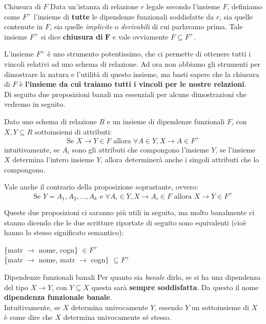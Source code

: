 \documentclass[12pt]{report}
\newcommand{\ra}{
	\rightarrow
}
\begin{document}
	\begin{definizione}{Chiusura di $F$}{}
		Data un'istanza di relazione $r$ legale secondo l'insieme $F$, definiamo come $F^+$ l'insieme di \textbf{tutte} le dipendenze funzionali soddisfatte da $r$, sia quelle contenute in $F$, sia quelle \textit{implicite} o \textit{derivabili} di cui parlavamo prima. Tale insieme $F^+$ si dice \textbf{chiusura di} $\mathbf{F}$ e vale ovviamente $F \subseteq F^+$.
	\end{definizione}
	L'insieme $F^+$ è uno strumento potentissimo, che ci permette di ottenere tutti i vincoli relativi ad uno schema di relazione. Ad ora non abbiamo gli strumenti per dimostrare la natura e l'utilità di questo insieme, ma basti sapere che la chiusura di $F$ è \textbf{l'insieme da cui traiamo tutti i vincoli per le nostre relazioni}.\\
	Di seguito due proposizioni banali ma essenziali per alcune dimostrazioni che vedremo in seguito.
	\begin{proposizione}{}{}
		Dato uno schema di relazione $R$ e un insieme di dipendenze funzionali $F$, con $X, Y \subseteq R$ sottoinsiemi di attributi:
		\[
			\text{Se } X \ra Y \in F \text{ allora } \forall A \in Y, X \ra A \in F^+
		\]
		intuitivamente, se $A_i$ sono gli attributi che compongono l'insieme $Y$, se l'insieme $X$ determina l'intero insieme $Y$, allora determinerà anche i singoli attributi che lo compongono.
	\end{proposizione}
	
	\begin{proposizione}{}{}
		Vale anche il contrario della proposizione soprastante, ovvero:
		\[
			\text{Se } Y = A_1, A_2, \dots, A_k \text{ e } \forall A_i \in Y, X \ra A_i \in F \text{ allora } X \ra Y \in F^+
		\]
	\end{proposizione}
	
	Queste due proposizioni ci saranno più utili in seguito, ma molto banalmente ci stanno dicendo che le due scritture riportate di seguito sono equivalenti (cioè hanno lo stesso significato semantico):
	\begin{center}
		\{matr $\ra$ nome, cogn\} $\in F^+$\\
		\{matr $\ra$ nome, matr $\ra$ cogn\} $\subseteq F^+$
	\end{center}
	
	\begin{proposizione}{Dipendenze funzionali banali}{}
		Per quanto sia \textit{banale} dirlo, se si ha una dipendenza del tipo $X \ra Y$, con $Y \subseteq X$ questa sarà \textbf{sempre soddisfatta}. Da questo il nome \textbf{dipendenza funzionale banale}.\\
		Intuitivamente, se $X$ determina univocamente $Y$, essendo $Y$ un sottoinsieme di $X$ è come dire che $X$ determina univocamente sé stesso.
	\end{proposizione}
	
\end{document}
